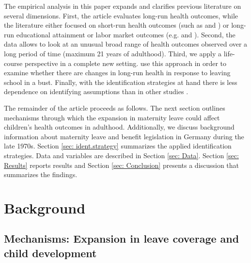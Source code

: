\documentclass[a4paper ]{article}
\begin{document}
The empirical analysis in this paper expands and clarifies previous literature on several dimensions. First, the article evaluates long-run health outcomes, while the literature either focused on short-run health outcomes (such as \cite{stearns2015effects} and \cite{rossin2011effects}) or long-run educational attainment or labor market outcomes (e.g. \cite{carneiro2015flying} and \cite{rasmussen2010increasing}). Second, the data allows to look at an unusual broad range of health outcomes observed over a long period of time (maximum 21 years of adulthood). Third, we apply a life-course perspective in a complete new setting. \cite{garrouste2015lasting} use this approach in order to examine whether there are changes in long-run health in response to leaving school in a bust. Finally, with the identification strategies at hand there is less dependence on identifying assumptions than in other studies \citep{ruhm2000parental}. \newline

The remainder of the article proceeds as follows. The next section outlines mechanisms through which the expansion in maternity leave could affect children's health outcomes in adulthood. Additionally, we discuss background information about maternity leave and benefit legislation in Germany during the late 1970s. Section \ref{sec: ident.strategy} summarizes the applied identification strategies. Data and variables are described in Section \ref{sec: Data}. Section \ref{sec: Results} reports results and Section \ref{sec: Conclusion} presents a discussion that summarizes the findings.





\bigskip
\section{Background}
\subsection{Mechanisms: Expansion in leave coverage and child development}\label{sec: 2.1 mechanism}
\end{document}
